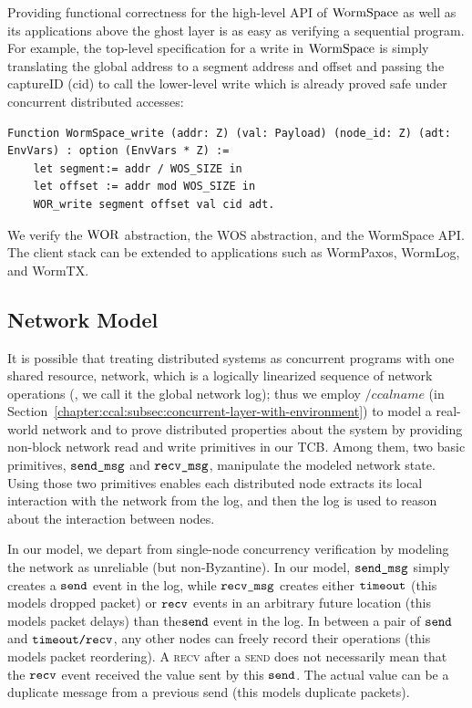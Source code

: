Providing functional correctness for the high-level API of $\mathrm{WormSpace}$ as well as its applications
above the ghost layer is as easy as verifying a sequential program.
For example, the top-level specification for a write in $\mathrm{WormSpace}$ is simply translating the global address to a segment address and offset and 
passing the captureID (cid) to call the lower-level write which is already proved safe under concurrent distributed accesses:
\begin{lstlisting}
Function WormSpace_write (addr: Z) (val: Payload) (node_id: Z) (adt: EnvVars) : option (EnvVars * Z) :=
    let segment:= addr / WOS_SIZE in 
    let offset := addr mod WOS_SIZE in
    WOR_write segment offset val cid adt.
\end{lstlisting}
 We verify the $\mathrm{WOR}$ abstraction, the WOS abstraction, and the WormSpace API.
 The client stack can be extended to applications such as WormPaxos, WormLog, and WormTX. 

\subsection{Network Model}
\label{subsec:network_modeling}

It is possible that treating distributed systems as concurrent programs with one shared resource, network, which is
a logically linearized sequence of network operations (\ie, we call it the global network log);
thus we employ $/ccalname$ (in Section~\ref{chapter:ccal:subsec:concurrent-layer-with-environment})
to model a real-world network and to prove distributed properties about the system
by providing non-block network read and write primitives in our TCB. 
Among them, two basic primitives, ${\mathrm{\texttt{send\_msg}}}$ and ${\mathrm{\texttt{recv\_msg}}}$, 
manipulate the modeled network state. 
Using those two primitives enables each distributed node  extracts its local interaction with the network from the log, 
and then the log is used to reason about the interaction between nodes.

In our model, we depart from single-node concurrency verification by modeling the network as unreliable (but non-Byzantine). 
In our model, ${\mathrm{\texttt{send\_msg}}}$ simply creates a ${\mathrm{\texttt{send}}}$ event in the log, 
while ${\mathrm{\texttt{recv\_msg}}}$ creates either ${\mathrm{\texttt{timeout}}}$ (this models dropped packet) or ${\mathrm{\texttt{recv}}}$ 
events in an arbitrary future location (this models packet delays) than the${\mathrm{\texttt{send}}}$ event in the log. 
In between a pair of ${\mathrm{\texttt{send}}}$ and ${\mathrm{\texttt{timeout/recv}}}$, 
any other nodes can freely record their operations (this models packet reordering). 
A \textsc{recv} after a \textsc{send} does not necessarily mean that the ${\mathrm{\texttt{recv}}}$ event received the value sent by this ${\mathrm{\texttt{send}}}$. 
The actual value can be a duplicate message from a previous send (this models duplicate packets).

